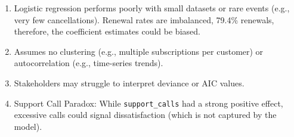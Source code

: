 \documentclass[
]{article}
\begin{document}
\begin{enumerate}
\def\labelenumi{\arabic{enumi}.}
\item
  Logistic regression performs poorly with small datasets or rare events
  (e.g., very few cancellations). Renewal rates are imbalanced, 79.4\%
  renewals, therefore, the coefficient estimates could be biased.
\item
  Assumes no clustering (e.g., multiple subscriptions per customer) or
  autocorrelation (e.g., time-series trends).
\item
  Stakeholders may struggle to interpret deviance or AIC values.
\item
  Support Call Paradox: While \texttt{support\_calls} had a strong
  positive effect, excessive calls could signal dissatisfaction (which
  is not captured by the model).
\end{enumerate}
\end{document}
